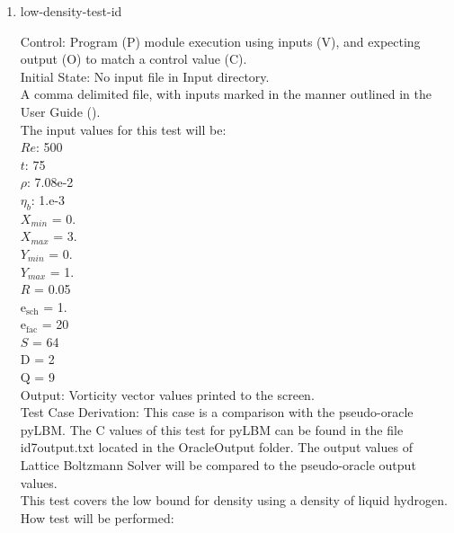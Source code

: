 \documentclass[12pt, titlepage]{article}
\newcommand{\famname}{Lattice Boltzmann Solver}
\newcounter{testcounter} %
\begin{document}
\begin{enumerate}
\item{low-density-test-id\thetestcounter \\}

Control: Program (P) module execution using inputs (V), and expecting output (O)
to match a control value (C).\\
					
Initial State: No input file in Input directory.\\
					
A comma delimited file, with inputs marked in the manner outlined in the User
Guide (\citet{LBM_UserGuide_PM}).\\The input values for this test will be:\\
$Re$: 500\\
$t$: 75\\
$\rho$: 7.08e-2\\
$\eta_b$: 1.e-3\\
$X_{min}$ = 0.\\
$X_{max}$ = 3.\\
$Y_{min}$ = 0.\\
$Y_{max}$ = 1.\\
$R$ = 0.05\\
$\mathrm{e_{sch}}$ = 1.\\
$\mathrm{e_{fac}}$ = 20\\
$S$ = 64\\
$\mathrm{D}$ = 2\\
$\mathrm{Q}$ = 9\\

Output: Vorticity vector values printed to the screen. \\

Test Case Derivation: This case is a comparison with the pseudo-oracle
pyLBM. The C values of this test for pyLBM can be found in the file
id7output.txt located in the OracleOutput folder. The output values of {\famname} will be compared to the pseudo-oracle output values.\\

This test covers the low bound for density using a density of liquid hydrogen.\\
					
How test will be performed: 


\end{enumerate}
\end{document}
